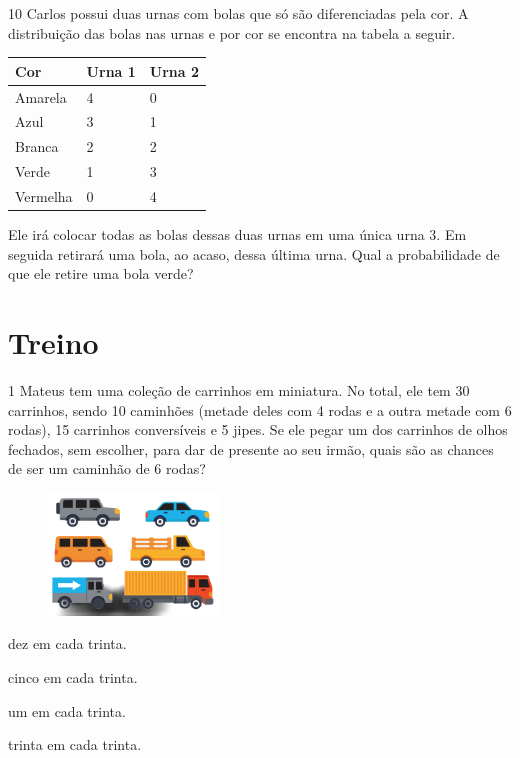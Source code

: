 

\num{10} Carlos possui duas urnas com bolas que só são diferenciadas pela cor. A
distribuição das bolas nas urnas e por cor se encontra na tabela a
seguir.

\begin{longtable}[]{@{}lll@{}}
\toprule
\hline
\textbf{Cor} & \textbf{Urna 1} & \textbf{Urna 2}\tabularnewline
\hline
\midrule
\endhead
Amarela & 4 & 0\tabularnewline
\hline
Azul & 3 & 1\tabularnewline
\hline
Branca & 2 & 2\tabularnewline
\hline
Verde & 1 & 3\tabularnewline
\hline
Vermelha & 0 & 4\tabularnewline
\hline
\bottomrule
\end{longtable}


Ele irá colocar todas as bolas dessas duas urnas em uma única urna 3. Em
seguida retirará uma bola, ao acaso, dessa última urna. Qual a
probabilidade de que ele retire uma bola verde?


\pagebreak
\section*{Treino}

\num{1} Mateus tem uma coleção de carrinhos em miniatura. No total, ele tem 30 carrinhos, sendo 10 caminhões (metade deles com 4 rodas e a outra metade com 6 rodas), 15 carrinhos conversíveis e 5 jipes. Se ele pegar um dos carrinhos de olhos fechados, sem escolher, para dar de presente ao seu irmão, quais são as chances de ser um caminhão de 6 rodas?

\begin{figure}[htpb!]
\centering
\includegraphics[width=0.4\textwidth]{./media/image75f.png}
\end{figure}

\begin{escolha}
\begin{multicols}{2}
\item
  dez em cada trinta.
\item
  cinco em cada trinta.
\item
  um em cada trinta.
\item
  trinta em cada trinta.
\end{multicols}
\end{escolha}


